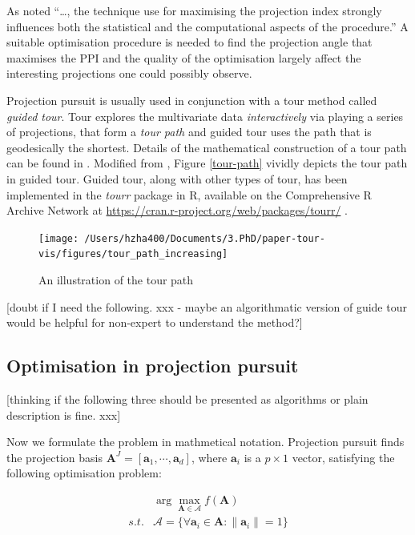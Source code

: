\documentclass[12pt]{article}
\begin{document}
As \citet{friedman1974projection} noted ``\ldots{}, the technique use
for maximising the projection index strongly influences both the
statistical and the computational aspects of the procedure.'' A suitable
optimisation procedure is needed to find the projection angle that
maximises the PPI and the quality of the optimisation largely affect the
interesting projections one could possibly observe.

Projection pursuit is usually used in conjunction with a tour method
called \emph{guided tour}. Tour explores the multivariate data
\emph{interactively} via playing a series of projections, that form a
\emph{tour path} and guided tour uses the path that is geodesically the
shortest. Details of the mathematical construction of a tour path can be
found in \citet{buja2005computational}. Modified from
\citet{buja2005computational}, Figure \ref{tour-path} vividly depicts
the tour path in guided tour. Guided tour, along with other types of
tour, has been implemented in the \emph{tourr} package in R, available
on the Comprehensive R Archive Network at
\url{https://cran.r-project.org/web/packages/tourr/}
\citep{wickham2011tourrpackage}.

\begin{figure}
\texttt{[image: /Users/hzha400/Documents/3.PhD/paper-tour-vis/figures/tour\_path\_increasing]} \caption{\label{tour-path}An illustration of the tour path}\label{fig:tour-path}
\end{figure}

{[}doubt if I need the following. xxx - maybe an algorithmatic version
of guide tour would be helpful for non-expert to understand the
method?{]}

\hypertarget{optimisation-in-projection-pursuit}{%
\subsection{Optimisation in projection
pursuit}\label{optimisation-in-projection-pursuit}}

{[}thinking if the following three should be presented as algorithms or
plain description is fine. xxx{]}

Now we formulate the problem in mathmetical notation. Projection pursuit
finds the projection basis
\(\mathbf{A}^J = [\mathbf{a}_1, \cdots, \mathbf{a}_d]\), where
\(\mathbf{a}_i\) is a \(p \times 1\) vector, satisfying the following
optimisation problem:

\begin{align}
&\arg \max_{\mathbf{A} \in \mathcal{A}} f(\mathbf{A}) \\
s.t. & \mathcal{A} = \{ \forall \mathbf{a}_i \in \mathbf{A}: \lVert \mathbf{a}_i \rVert = 1 \}
\end{align}
\end{document}
